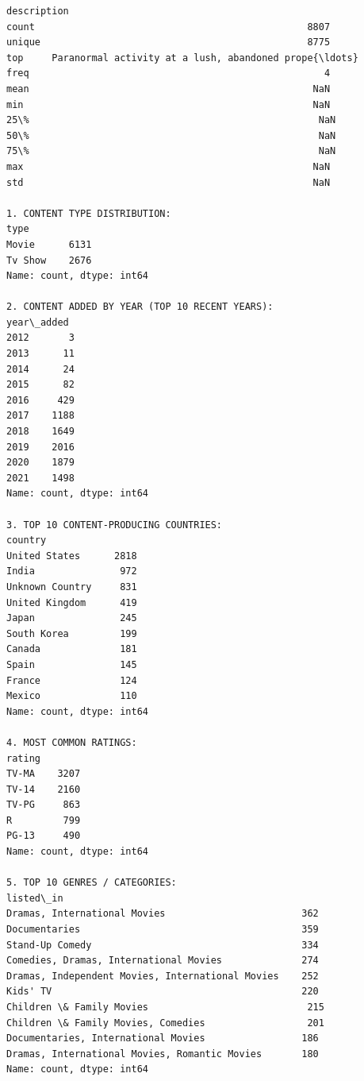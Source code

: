 \documentclass[11pt]{article}
\begin{document}
\begin{Verbatim}[commandchars=\\\{\}]
                                              description
count                                                8807
unique                                               8775
top     Paranormal activity at a lush, abandoned prope{\ldots}
freq                                                    4
mean                                                  NaN
min                                                   NaN
25\%                                                   NaN
50\%                                                   NaN
75\%                                                   NaN
max                                                   NaN
std                                                   NaN

1. CONTENT TYPE DISTRIBUTION:
type
Movie      6131
Tv Show    2676
Name: count, dtype: int64

2. CONTENT ADDED BY YEAR (TOP 10 RECENT YEARS):
year\_added
2012       3
2013      11
2014      24
2015      82
2016     429
2017    1188
2018    1649
2019    2016
2020    1879
2021    1498
Name: count, dtype: int64

3. TOP 10 CONTENT-PRODUCING COUNTRIES:
country
United States      2818
India               972
Unknown Country     831
United Kingdom      419
Japan               245
South Korea         199
Canada              181
Spain               145
France              124
Mexico              110
Name: count, dtype: int64

4. MOST COMMON RATINGS:
rating
TV-MA    3207
TV-14    2160
TV-PG     863
R         799
PG-13     490
Name: count, dtype: int64

5. TOP 10 GENRES / CATEGORIES:
listed\_in
Dramas, International Movies                        362
Documentaries                                       359
Stand-Up Comedy                                     334
Comedies, Dramas, International Movies              274
Dramas, Independent Movies, International Movies    252
Kids' TV                                            220
Children \& Family Movies                            215
Children \& Family Movies, Comedies                  201
Documentaries, International Movies                 186
Dramas, International Movies, Romantic Movies       180
Name: count, dtype: int64
    \end{Verbatim}
\end{document}
